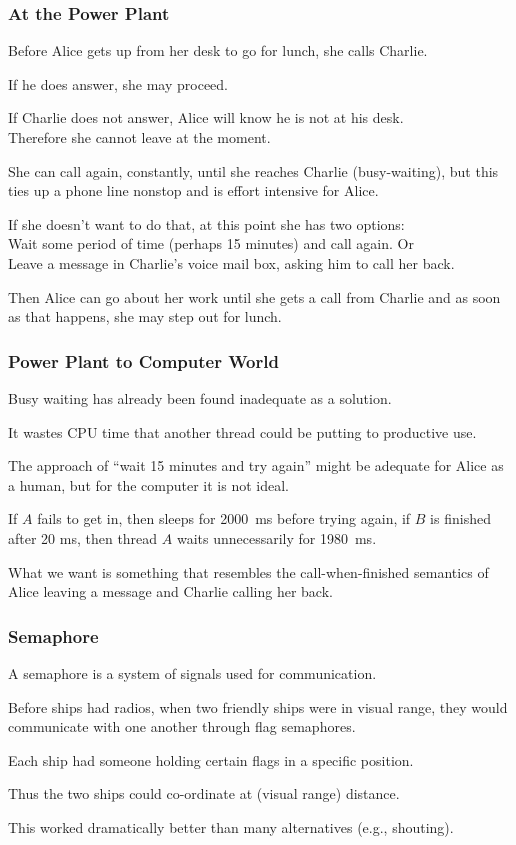 \begin{frame}
\frametitle{At the Power Plant}

Before Alice gets up from her desk to go for lunch, she calls Charlie. 

If he does answer, she may proceed. 

If Charlie does not answer, Alice will know he is not at his desk.\\
\quad Therefore she cannot leave at the moment. 

She can call again, constantly, until she reaches Charlie (busy-waiting), but this ties up a phone line nonstop and is effort intensive for Alice. 

If she doesn't want to do that, at this point she has two options:\\
\quad Wait some period of time (perhaps 15 minutes) and call again. Or\\
\quad Leave a message in Charlie's voice mail box, asking him to call her back.

Then Alice can go about her work until she gets a call from Charlie and as soon as that happens, she may step out for lunch.


\end{frame}

\begin{frame}
\frametitle{Power Plant to Computer World}

Busy waiting has already been found inadequate as a solution. 

It wastes CPU time that another thread could be putting to productive use. 

The approach of ``wait 15 minutes and try again'' might be adequate for Alice as a human, but for the computer it is not ideal. 

If $A$ fails to get in, then sleeps for 2000~ms before trying again, if $B$ is finished after 20 ms, then thread $A$ waits unnecessarily for 1980~ms. 

What we want is something that resembles the call-when-finished semantics of Alice leaving a message and Charlie calling her back.

\end{frame}

\begin{frame}
\frametitle{Semaphore}

A semaphore is a system of signals used for communication. 

Before ships had radios, when two friendly ships were in visual range, they would communicate with one another through flag semaphores.

Each ship had someone holding certain flags in a specific position. 

Thus the two ships could co-ordinate at (visual range) distance.

This worked dramatically better than many alternatives (e.g., shouting).

\end{frame}

